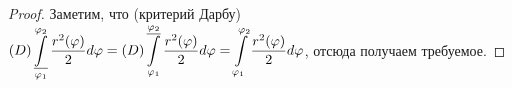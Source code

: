 \begin{proof}
    Заметим, что (критерий Дарбу) $\displaystyle(D)\operatorname*{\underline{\int}}\limits_{\varphi_1}^{\varphi_2}\frac{r^2(\varphi)}{2}d\varphi = (D)\operatorname*{\overline{\int}}\limits_{\varphi_1}^{\varphi_2}\frac{r^2(\varphi)}{2}d\varphi = \int\limits_{\varphi_1}^{\varphi_2}\frac{r^2(\varphi)}{2}d\varphi$, отсюда получаем требуемое.
\end{proof}

